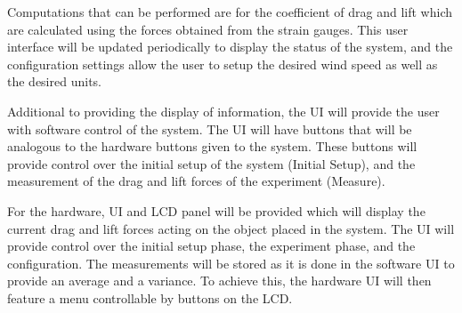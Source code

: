 		Computations that can be performed are for the coefficient of drag and lift which are calculated using the forces obtained from the strain gauges. This user interface will be updated periodically to display the status of the system, and the configuration settings allow the user to setup the desired wind speed as well as the desired units. 

		Additional to providing the display of information, the UI will provide the user with software control of the system. The UI will have buttons that will be analogous to the hardware buttons given to the system. These buttons will provide control over the initial setup of the system (Initial Setup), and the measurement of the drag and lift forces of the experiment (Measure). 

		For the hardware, UI and LCD panel will be provided which will display the current drag and lift forces acting on the object placed in the system. The UI will provide control over the initial setup phase, the experiment phase, and the configuration. The measurements will be stored as it is done in the software UI to provide an average and a variance. To achieve this, the hardware UI will then feature a menu controllable by buttons on the LCD. 